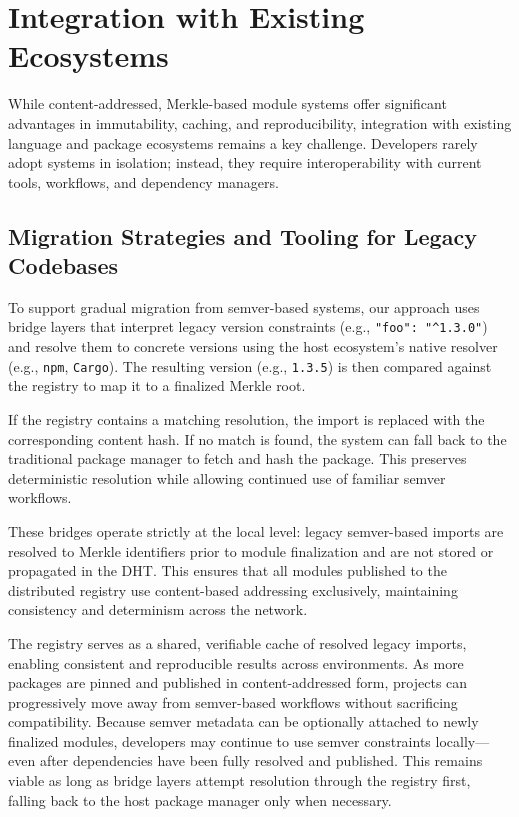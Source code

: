 \documentclass[sigplan,screen]{acmart}
\begin{document}
\section{Integration with Existing Ecosystems}
\label{sec:integation-existing-ecosystems}

While content-addressed, Merkle-based module systems offer significant advantages in immutability, caching, and reproducibility, integration with existing language and package ecosystems remains a key challenge. Developers rarely adopt systems in isolation; instead, they require interoperability with current tools, workflows, and dependency managers.

\subsection{Migration Strategies and Tooling for Legacy Codebases}
\label{sec:migration-strategies}

To support gradual migration from semver-based systems, our approach uses bridge layers that interpret legacy version constraints (e.g., \verb#"foo": "^1.3.0"#) and resolve them to concrete versions using the host ecosystem's native resolver (e.g., \texttt{npm}, \texttt{Cargo}). The resulting version (e.g., \texttt{1.3.5}) is then compared against the registry to map it to a finalized Merkle root.

If the registry contains a matching resolution, the import is replaced with the corresponding content hash. If no match is found, the system can fall back to the traditional package manager to fetch and hash the package. This preserves deterministic resolution while allowing continued use of familiar semver workflows.

These bridges operate strictly at the local level: legacy semver-based imports are resolved to Merkle identifiers prior to module finalization and are not stored or propagated in the DHT. This ensures that all modules published to the distributed registry use content-based addressing exclusively, maintaining consistency and determinism across the network.

The registry serves as a shared, verifiable cache of resolved legacy imports, enabling consistent and reproducible results across environments. As more packages are pinned and published in content-addressed form, projects can progressively move away from semver-based workflows without sacrificing compatibility. Because semver metadata can be optionally attached to newly finalized modules, developers may continue to use semver constraints locally—even after dependencies have been fully resolved and published. This remains viable as long as bridge layers attempt resolution through the registry first, falling back to the host package manager only when necessary.
\end{document}

